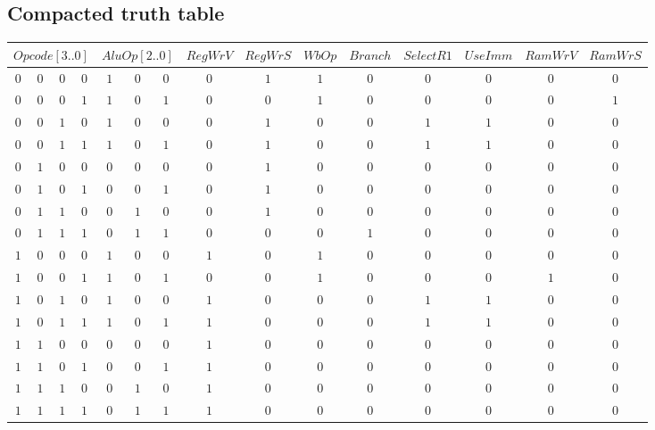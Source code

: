 \documentclass [15pt,a4paper,twoside]{article}
\begin{document}
\subsection{Compacted truth table}
\begin{center}
\begin{tabular}{cccc|ccccccccccc}
\multicolumn{4}{c|}{$Opcode[3..0]$}&\multicolumn{3}{c}{$AluOp[2..0]$}&$RegWrV$&$RegWrS$&$WbOp$&$Branch$&$SelectR1$&$UseImm$&$RamWrV$&$RamWrS$\\
\hline
$0$&$0$&$0$&$0$&$1$&$0$&$0$&$0$&$1$&$1$&$0$&$0$&$0$&$0$&$0$\\
$0$&$0$&$0$&$1$&$1$&$0$&$1$&$0$&$0$&$1$&$0$&$0$&$0$&$0$&$1$\\
$0$&$0$&$1$&$0$&$1$&$0$&$0$&$0$&$1$&$0$&$0$&$1$&$1$&$0$&$0$\\
$0$&$0$&$1$&$1$&$1$&$0$&$1$&$0$&$1$&$0$&$0$&$1$&$1$&$0$&$0$\\
$0$&$1$&$0$&$0$&$0$&$0$&$0$&$0$&$1$&$0$&$0$&$0$&$0$&$0$&$0$\\
$0$&$1$&$0$&$1$&$0$&$0$&$1$&$0$&$1$&$0$&$0$&$0$&$0$&$0$&$0$\\
$0$&$1$&$1$&$0$&$0$&$1$&$0$&$0$&$1$&$0$&$0$&$0$&$0$&$0$&$0$\\
$0$&$1$&$1$&$1$&$0$&$1$&$1$&$0$&$0$&$0$&$1$&$0$&$0$&$0$&$0$\\
$1$&$0$&$0$&$0$&$1$&$0$&$0$&$1$&$0$&$1$&$0$&$0$&$0$&$0$&$0$\\
$1$&$0$&$0$&$1$&$1$&$0$&$1$&$0$&$0$&$1$&$0$&$0$&$0$&$1$&$0$\\
$1$&$0$&$1$&$0$&$1$&$0$&$0$&$1$&$0$&$0$&$0$&$1$&$1$&$0$&$0$\\
$1$&$0$&$1$&$1$&$1$&$0$&$1$&$1$&$0$&$0$&$0$&$1$&$1$&$0$&$0$\\
$1$&$1$&$0$&$0$&$0$&$0$&$0$&$1$&$0$&$0$&$0$&$0$&$0$&$0$&$0$\\
$1$&$1$&$0$&$1$&$0$&$0$&$1$&$1$&$0$&$0$&$0$&$0$&$0$&$0$&$0$\\
$1$&$1$&$1$&$0$&$0$&$1$&$0$&$1$&$0$&$0$&$0$&$0$&$0$&$0$&$0$\\
$1$&$1$&$1$&$1$&$0$&$1$&$1$&$1$&$0$&$0$&$0$&$0$&$0$&$0$&$0$\\

\end{tabular}
\end{center}
\end{document}
